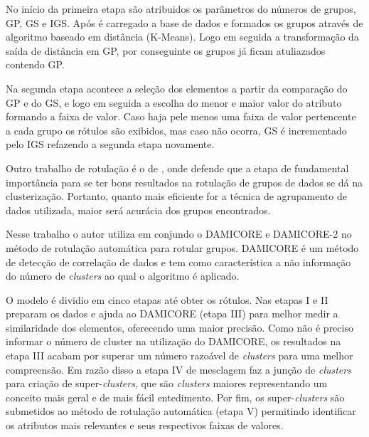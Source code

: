 No início da primeira etapa são atribuidos os parâmetros do números de grupos, GP, GS e IGS. Após é carregado a base de dados e formados os grupos através de algoritmo baseado em distância (K-Means). Logo em seguida a transformação da saída de distância em GP, por conseguinte os grupos já ficam atuliazados contendo GP.

Na segunda etapa acontece a seleção dos elementos a partir da comparação do GP e do GS, e logo em seguida a escolha do menor e maior valor do atributo formando a faixa de valor. Caso haja pele menos uma faixa de valor pertencente a cada grupo os rótulos são exibidos, mas caso não ocorra, GS é incrementado pelo IGS refazendo a segunda etapa novamente. 

Outro trabalho de rotulação é o de , onde defende que a etapa de fundamental importância para se ter bons resultados na rotulação de grupos de dados se dá na clusterização. Portanto, quanto mais eficiente for a técnica de agrupamento de dados utilizada, maior será  acurácia dos grupos encontrados.

Nesse trabalho o autor utiliza em conjundo o DAMICORE e DAMICORE-2 no método de rotulação automática para rotular  grupos. DAMICORE é um método de detecção de correlação de dados e tem como característica a não informação do número de \textit{clusters} ao qual o algoritmo é aplicado. 

O modelo é dividio em cinco etapas até obter os rótulos. Nas etapas I e II preparam os dados e ajuda ao DAMICORE (etapa III) para melhor medir a similaridade dos elementos, oferecendo uma maior precisão. Como não é preciso informar o número de cluster na utilização do DAMICORE, os resultados na etapa III acabam por superar um número razoável de \textit{clusters} para uma melhor compreensão. Em razão disso a etapa IV de mesclagem faz a junção de \textit{clusters} para criação de super-\textit{clusters}, que são \textit{clusters} maiores representando um conceito mais geral e de mais fácil entedimento. Por fim, os super-\textit{clusters} são submetidos ao método de rotulação automática (etapa V) permitindo identificar os atributos mais relevantes e seus respectivos faixas de valores.
